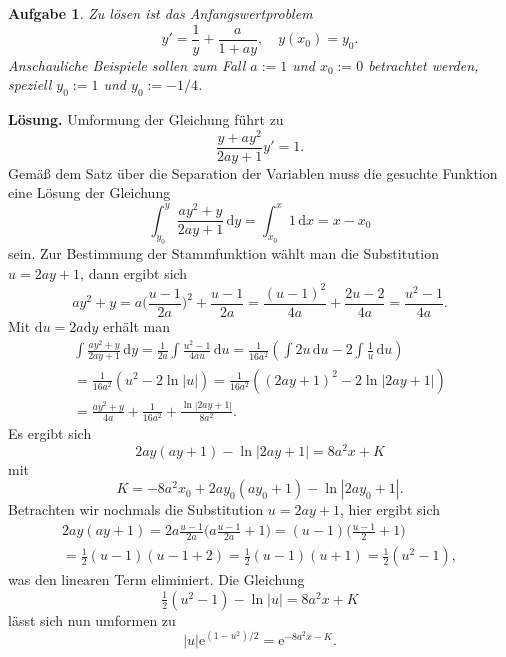 \documentclass[a4paper,10pt,fleqn,twoside]{scrartcl}
\numberwithin{equation}{section}
\newcommand{\ee}{\mathrm e}
\newcommand{\strong}[1]{{\normalfont\sffamily\bfseries #1}}
\theoremstyle{Aufgabe}
\newtheorem{Aufgabe}{\sffamily Aufgabe}[section]
\begin{document}
\begin{Aufgabe}
Zu lösen ist das Anfangswertproblem
\[y' = \frac{1}{y}+\frac{a}{1+ay},\quad y(x_0)=y_0.\]
Anschauliche Beispiele sollen zum Fall $a:=1$ und $x_0:=0$ betrachtet
werden, speziell $y_0:=1$ und $y_0:=-1/4$.
\end{Aufgabe}
\strong{Lösung.} Umformung der Gleichung führt zu
\begin{equation}
\frac{y+ay^2}{2ay+1}y' = 1.
\end{equation}
Gemäß dem Satz über die Separation der Variablen muss die gesuchte
Funktion eine Lösung der Gleichung
\begin{equation}
\int_{y_0}^y \frac{ay^2+y}{2ay+1}\,\mathrm dy
= \int_{x_0}^x 1\,\mathrm dx = x-x_0
\end{equation}
sein. Zur Bestimmung der Stammfunktion wählt man die Substitution
$u=2ay+1$, dann ergibt sich
\begin{equation}
ay^2+y = a\bigg(\frac{u-1}{2a}\bigg)^2+\frac{u-1}{2a} =
\frac{(u-1)^2}{4a}+\frac{2u-2}{4a} = \frac{u^2-1}{4a}.
\end{equation}
Mit $\mathrm du = 2a\mathrm dy$ erhält man
\begin{gather}
\int\frac{ay^2+y}{2ay+1}\,\mathrm dy
= \frac{1}{2a}\int \frac{u^2-1}{4au}\,\mathrm du
= \frac{1}{16a^2}(\int 2u\,\mathrm du-2\int\frac{1}{u}\,\mathrm du)\\
= \frac{1}{16a^2}(u^2-2\ln|u|) = \frac{1}{16a^2}((2ay+1)^2-2\ln|2ay+1|)\\
= \frac{ay^2+y}{4a}+\frac{1}{16a^2}+\frac{\ln|2ay+1|}{8a^2}.
\end{gather}
Es ergibt sich
\begin{equation}
2ay(ay+1)-\ln|2ay+1| = 8a^2x+K
\end{equation}
mit
\begin{equation}
K = -8a^2x_0+2ay_0(ay_0+1)-\ln|2ay_0+1|.
\end{equation}
Betrachten wir nochmals die Substitution $u=2ay+1$, hier ergibt sich
\begin{gather}
2ay(ay+1) = 2a\frac{u-1}{2a}\bigg(a\frac{u-1}{2a}+1\bigg)
= (u-1)\bigg(\frac{u-1}{2}+1\bigg)\\
= \tfrac{1}{2}(u-1)(u-1+2) = \tfrac{1}{2}(u-1)(u+1) = \tfrac{1}{2}(u^2-1),
\end{gather}
was den linearen Term eliminiert. Die Gleichung
\begin{equation}
\tfrac{1}{2}(u^2-1)-\ln|u| = 8a^2x+K
\end{equation}
lässt sich nun umformen zu
\begin{equation}
|u|\ee^{(1-u^2)/2} = \ee^{-8a^2x-K}.
\end{equation}
\end{document}
